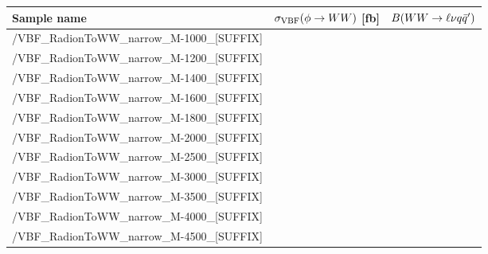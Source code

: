 \scriptsize
\begin{tabular}{lrr}
  \hline
  \textbf{Sample name} & $\sigma_{\mathrm{VBF}}(\phi\to WW)$ [fb] & $B(WW\to\ell\nu q\bar{q}')$ \\
  \hline
  \ttfamily /VBF\_RadionToWW\_narrow\_M-1000\_[SUFFIX] &   \\
  \ttfamily /VBF\_RadionToWW\_narrow\_M-1200\_[SUFFIX] &   \\
  \ttfamily /VBF\_RadionToWW\_narrow\_M-1400\_[SUFFIX] &   \\
  \ttfamily /VBF\_RadionToWW\_narrow\_M-1600\_[SUFFIX] &   \\
  \ttfamily /VBF\_RadionToWW\_narrow\_M-1800\_[SUFFIX] &   \\
  \ttfamily /VBF\_RadionToWW\_narrow\_M-2000\_[SUFFIX] &   \\
  \ttfamily /VBF\_RadionToWW\_narrow\_M-2500\_[SUFFIX] &   \\
  \ttfamily /VBF\_RadionToWW\_narrow\_M-3000\_[SUFFIX] &   \\
  \ttfamily /VBF\_RadionToWW\_narrow\_M-3500\_[SUFFIX] &   \\
  \ttfamily /VBF\_RadionToWW\_narrow\_M-4000\_[SUFFIX] &   \\
  \ttfamily /VBF\_RadionToWW\_narrow\_M-4500\_[SUFFIX] &   \\
  \hline
\end{tabular}
